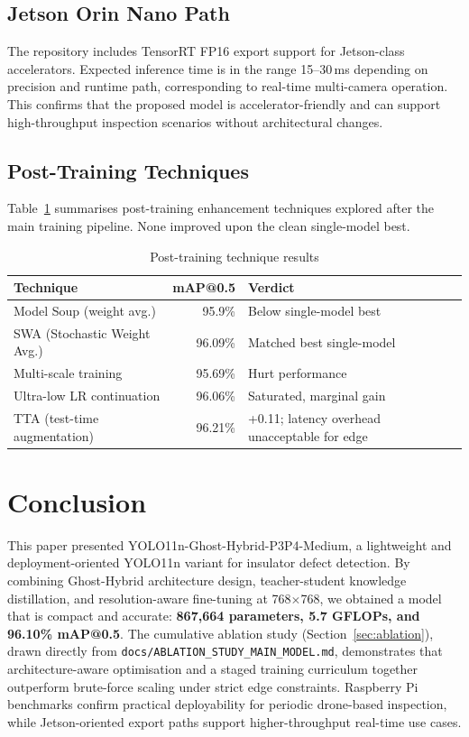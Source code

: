 \documentclass[11pt,a4paper]{article}
\begin{document}
\subsection{Jetson Orin Nano Path}

The repository includes TensorRT FP16 export support for Jetson-class accelerators.
Expected inference time is in the range 15--30\,ms depending on precision and runtime
path, corresponding to real-time multi-camera operation. This confirms that the
proposed model is accelerator-friendly and can support high-throughput inspection
scenarios without architectural changes.

\subsection{Post-Training Techniques}

Table~\ref{tab:post_training} summarises post-training enhancement techniques explored
after the main training pipeline. None improved upon the clean single-model best.

\begin{table}[H]
\centering
\caption{Post-training technique results}
\label{tab:post_training}
\begin{tabular}{lrl}
\toprule
\textbf{Technique}         & \textbf{mAP@0.5} & \textbf{Verdict} \\
\midrule
Model Soup (weight avg.)   & 95.9\%  & Below single-model best \\
SWA (Stochastic Weight Avg.)& 96.09\% & Matched best single-model \\
Multi-scale training       & 95.69\% & Hurt performance \\
Ultra-low LR continuation  & 96.06\% & Saturated, marginal gain \\
TTA (test-time augmentation)& 96.21\% & +0.11; latency overhead unacceptable for edge \\
\bottomrule
\end{tabular}
\end{table}

\section{Conclusion}
\label{sec:conclusion}

This paper presented YOLO11n-Ghost-Hybrid-P3P4-Medium, a lightweight and
deployment-oriented YOLO11n variant for insulator defect detection. By combining
Ghost-Hybrid architecture design, teacher-student knowledge distillation, and
resolution-aware fine-tuning at 768$\times$768, we obtained a model that is compact
and accurate: \textbf{867,664 parameters, 5.7 GFLOPs, and 96.10\% mAP@0.5}. The
cumulative ablation study (Section~\ref{sec:ablation}), drawn directly from
\texttt{docs/ABLATION\_STUDY\_MAIN\_MODEL.md}, demonstrates that architecture-aware
optimisation and a staged training curriculum together outperform brute-force scaling
under strict edge constraints. Raspberry Pi benchmarks confirm practical deployability
for periodic drone-based inspection, while Jetson-oriented export paths support
higher-throughput real-time use cases.
\end{document}
